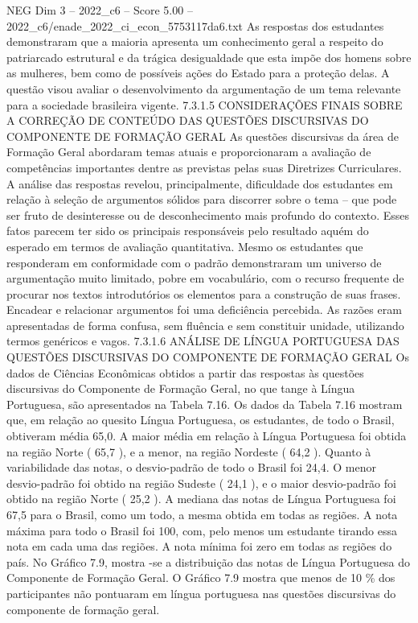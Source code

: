 \begin{textsample}{NEG Dim 3 – 2022\_c6 – Score 5.00 – 2022\_c6/enade\_2022\_ci\_econ\_5753117da6.txt}
As respostas dos estudantes demonstraram que a maioria apresenta um conhecimento geral a respeito do patriarcado estrutural e da trágica desigualdade que esta impõe dos homens sobre as mulheres, bem como de possíveis ações do Estado para a proteção delas.
A questão visou avaliar o desenvolvimento da argumentação de um tema relevante para a sociedade brasileira vigente. 7.3.1.5 CONSIDERAÇÕES FINAIS SOBRE A CORREÇÃO DE CONTEÚDO DAS QUESTÕES DISCURSIVAS DO COMPONENTE DE FORMAÇÃO GERAL As questões discursivas da área de Formação Geral abordaram temas atuais e proporcionaram a avaliação de competências importantes dentre as previstas pelas suas Diretrizes Curriculares.
A análise das respostas revelou, principalmente, dificuldade dos estudantes em relação à seleção de argumentos sólidos para discorrer sobre o tema – que pode ser fruto de desinteresse ou de desconhecimento mais profundo do contexto.
Esses fatos parecem ter sido os principais responsáveis pelo resultado aquém do esperado em termos de avaliação quantitativa.
Mesmo os estudantes que responderam em conformidade com o padrão demonstraram um universo de argumentação muito limitado, pobre em vocabulário, com o recurso frequente de procurar nos textos introdutórios os elementos para a construção de suas frases.
Encadear e relacionar argumentos foi uma deficiência percebida.
As razões eram apresentadas de forma confusa, sem fluência e sem constituir unidade, utilizando termos genéricos e vagos. 7.3.1.6 ANÁLISE DE LÍNGUA PORTUGUESA DAS QUESTÕES DISCURSIVAS DO COMPONENTE DE FORMAÇÃO GERAL Os dados de Ciências Econômicas obtidos a partir das respostas às questões discursivas do Componente de Formação Geral, no que tange à Língua Portuguesa, são apresentados na Tabela 7.16.
Os dados da Tabela 7.16 mostram que, em relação ao quesito Língua Portuguesa, os estudantes, de todo o Brasil, obtiveram média 65,0.
A maior média em relação à Língua Portuguesa foi obtida na região Norte ( 65,7 ), e a menor, na região Nordeste ( 64,2 ).
Quanto à variabilidade das notas, o desvio-padrão de todo o Brasil foi 24,4.
O menor desvio-padrão foi obtido na região Sudeste ( 24,1 ), e o maior desvio-padrão foi obtido na região Norte ( 25,2 ).
A mediana das notas de Língua Portuguesa foi 67,5 para o Brasil, como um todo, a mesma obtida em todas as regiões.
A nota máxima para todo o Brasil foi 100, com, pelo menos um estudante tirando essa nota em cada uma das regiões.
A nota mínima foi zero em todas as regiões do país.
No Gráfico 7.9, mostra -se a distribuição das notas de Língua Portuguesa do Componente de Formação Geral.
O Gráfico 7.9 mostra que menos de 10 \% dos participantes não pontuaram em língua portuguesa nas questões discursivas do componente de formação geral.

\end{textsample}
